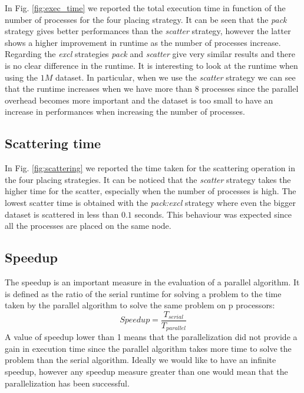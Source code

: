 In Fig. \ref{fig:exec_time} we reported the total execution time in function of the number of processes for the four placing strategy.
It can be seen that the \textit{pack} strategy gives better performances than the \textit{scatter} strategy, however
the latter shows a higher improvement in runtime as the number of processes increase. Regarding the \textit{excl} strategies
\textit{pack} and \textit{scatter} give very similar results and there is no clear difference in the runtime.
It is interesting to look at the runtime when using the $1M$ dataset. In particular, when we use the \textit{scatter} strategy we can
see that the runtime increases when we have more than $8$ processes since the parallel overhead becomes more important and the dataset is too
small to have an increase in performances when increasing the number of processes.

\subsection{Scattering time}
In Fig. \ref{fig:scattering} we reported the time taken for the scattering operation in the four placing strategies. It can be
noticed that the \textit{scatter} strategy takes the higher time for the scatter, especially when the number of processes is high.
The lowest scatter time is obtained with the \textit{pack:excl} strategy where even the bigger dataset is scattered in less than $0.1$ seconds.
This behaviour was expected since all the processes are placed on the same node.

\subsection{Speedup}
The speedup is an important measure in the evaluation of a parallel algorithm.
It is defined as the ratio of the serial runtime for solving a problem to the time taken by the
parallel algorithm to solve the same problem on p processors:
\begin{equation}
  Speedup = \frac{T_{serial}}{T_{parallel}}
\end{equation}
A value of speedup lower than 1 means that the parallelization did not provide a gain in execution time
since the parallel algorithm takes more time to solve the problem than the serial algorithm.
Ideally we would like to have an infinite speedup, however any speedup measure greater than one would
mean that the parallelization has been successful.

